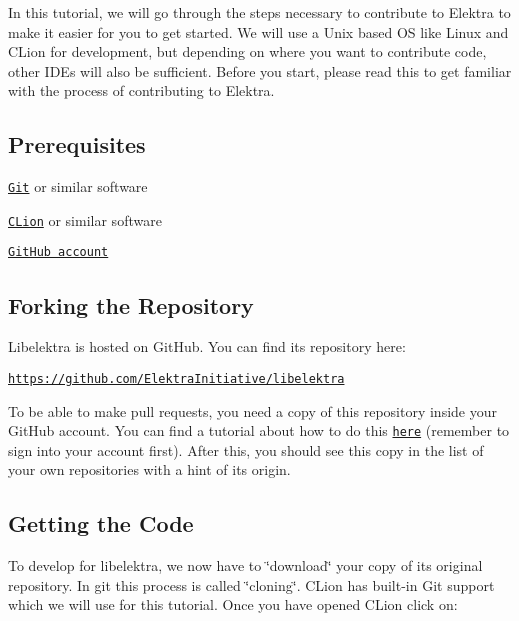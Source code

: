 In this tutorial, we will go through the steps necessary to contribute to Elektra to make it easier for you to get started. We will use a Unix based OS like Linux and C\+Lion for development, but depending on where you want to contribute code, other I\+D\+Es will also be sufficient. Before you start, please read this to get familiar with the process of contributing to Elektra.

\subsection*{Prerequisites}


\begin{DoxyItemize}
\item \href{https://git-scm.com/download}{\tt Git} or similar software
\item \href{https://www.jetbrains.com/clion/}{\tt C\+Lion} or similar software
\item \href{https://github.com/}{\tt Git\+Hub account}
\end{DoxyItemize}

\subsection*{Forking the Repository}

Libelektra is hosted on Git\+Hub. You can find its repository here\+:


\begin{DoxyItemize}
\item \href{https://github.com/ElektraInitiative/libelektra}{\tt https\+://github.\+com/\+Elektra\+Initiative/libelektra}
\end{DoxyItemize}

To be able to make pull requests, you need a copy of this repository inside your Git\+Hub account. You can find a tutorial about how to do this \href{https://help.github.com/en/articles/fork-a-repo}{\tt here} (remember to sign into your account first). After this, you should see this copy in the list of your own repositories with a hint of it\textquotesingle{}s origin.

\subsection*{Getting the Code}

To develop for libelektra, we now have to \char`\"{}download\char`\"{} your copy of its original repository. In git this process is called \char`\"{}cloning\char`\"{}. C\+Lion has built-\/in Git support which we will use for this tutorial. Once you have opened C\+Lion click on\+:

